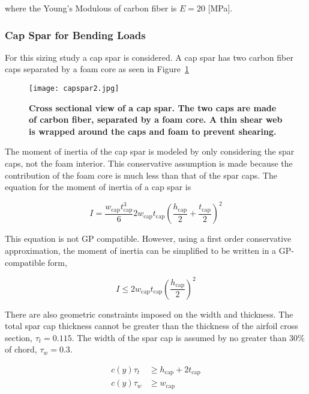 \documentclass[]{aiaa-tc}%
\begin{document}
where the Young's Modulous of carbon fiber is $E = 20$ [MPa]. 

\subsubsection{Cap Spar for Bending Loads}

For this sizing study a cap spar is considered.  A cap spar has two carbon fiber caps separated by a foam core as seen in Figure~\ref{f:capspar}

\begin{figure}[H]
	\begin{center}
	\texttt{[image: capspar2.jpg]}
    \caption{ \textbf{ Cross sectional view of a cap spar.  The two caps are made of carbon fiber, separated by a foam core. A thin shear web is wrapped around the caps and foam to prevent shearing.}}
	\label{f:capspar}
	\end{center}
\end{figure}

The moment of inertia of the cap spar is modeled by only considering the spar caps, not the foam interior.  
This conservative assumption is made because the contribution of the foam core is much less than that of the spar caps.  
The equation for the moment of inertia\cite{bending} of a cap spar is 

\begin{equation}
    \label{e:moispar}
    I = \frac{w_{\text{cap}}t_{\text{cap}}^3}{6} 2w_{\text{cap}}t_{\text{cap}}\left( \frac{h_{\text{cap}}}{2} + \frac{t_{\text{cap}}}{2} \right)^2
\end{equation}

This equation is not GP compatible.  However, using a first order conservative approximation, the moment of inertia can be simplified to be written in a GP-compatible form, 

\begin{equation}
    \label{e:moispar}
    I \leq 2w_{\text{cap}}t_{\text{cap}}\left(\frac{h_{\text{cap}}}{2}\right)^2
\end{equation}

There are also geometric constraints imposed on the width and thickness.  The total spar cap thickness cannot be greater than the thickness of the airfoil cross section, $\tau_t = 0.115$.  The width of the spar cap is assumed by no greater than 30\% of chord, $\tau_w = 0.3$.

\begin{align}
    \label{e:thickness}
    c(y)\tau_t &\geq h_{\text{cap}} + 2t_{\text{cap}} \\
    \label{e:width}
    c(y)\tau_w &\geq w_{\text{cap}} 
    \end{align}
\end{document}
